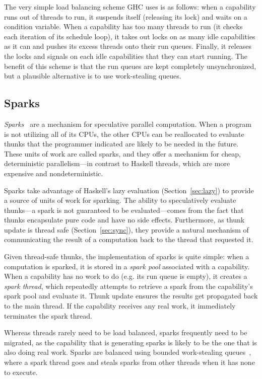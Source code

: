 The very simple load balancing scheme GHC uses is as follows: when a
capability runs out of threads to run, it suspends itself (releasing its
lock) and waits on a condition variable.  When a capability has too many
threads to run (it checks each iteration of its schedule loop), it takes
out locks on as many idle capabilities as it can and pushes its excess
threads onto their run queues.  Finally, it releases the locks and
signals on each idle capabilities that they can start running.  The
benefit of this scheme is that the run queues are kept completely
unsynchronized, but a plausible alternative is to use work-stealing
queues.

\subsection{Sparks}

\emph{Sparks}~\cite{Marlow2009} are a mechanism for speculative parallel computation.
When a program is not utilizing all of its CPUs, the other CPUs can be
reallocated to evaluate thunks that the programmer indicated are likely
to be needed in the future.  These units of work are called sparks, and
they offer a mechanism for cheap, deterministic parallelism---in contrast to
Haskell threads, which are more expensive and nondeterministic.

Sparks take advantage of Haskell's lazy evaluation (Section~\ref{sec:lazy}) to provide a source
of units of work for sparking.  The ability to speculatively evaluate
thunks---a spark is not guaranteed to be evaluated---comes from the fact
that thunks encapsulate pure code and have no side effects.
Furthermore, as thunk update is thread safe (Section~\ref{sec:sync}),
they provide a natural mechanism of communicating the result of a
computation back to the thread that requested it.

Given thread-safe thunks, the implementation of sparks is quite simple:
when a computation is sparked, it is stored in a \emph{spark pool}
associated with a capability.  When a capability has no work to do (e.g.
its run queue is empty), it creates a \emph{spark thread}, which
repeatedly attempts to retrieve a spark from the capability's spark pool
and evaluate it.  Thunk update ensures the results get propagated back
to the main thread. If the capability receives any real work, it
immediately terminates the spark thread.

Whereas threads rarely need to be load balanced, sparks frequently need
to be migrated, as the capability that is generating sparks is likely to
be the one that is also doing real work.  Sparks are balanced using
bounded work-stealing queues~\cite{Arora:1998:TSM:277651.277678,Hendler2005}, where a spark thread goes and steals
sparks from other threads when it has none to execute.

